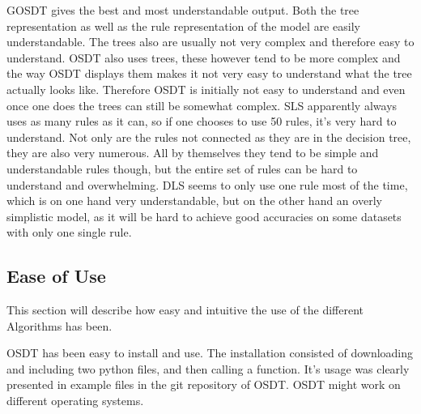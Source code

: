 \documentclass[a4paper,preprint]{sig-alternate-xt}
\begin{document}
GOSDT gives the best and most understandable output. Both the tree representation as well as the rule representation of the model are easily understandable. The trees also are usually not very complex and therefore easy to understand. 
OSDT also uses trees, these however tend to be more complex and the way OSDT displays them makes it not very easy to understand what the tree actually looks like. Therefore OSDT is initially not easy to understand and even once one does the trees can still be somewhat complex. 
SLS apparently always uses as many rules as it can, so if one chooses to use 50 rules, it's very hard to understand. Not only are the rules not connected as they are in the decision tree, they are also very numerous. All by themselves they tend to be simple and understandable rules though, but the entire set of rules can be hard to understand and overwhelming.
DLS seems to only use one rule most of the time, which is on one hand very understandable, but on the other hand an overly simplistic model, as it will be hard to achieve good accuracies on some datasets with only one single rule. 

\subsection{Ease of Use}
\label{subsec:eou}

This section will describe how easy and intuitive the use of the different Algorithms has been. 

OSDT has been easy to install and use. The installation consisted of downloading and including two python files, and then calling a function. It's usage was clearly presented in example files in the git repository of OSDT. OSDT might work on different operating systems.
\end{document}

